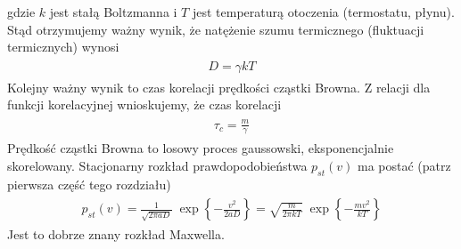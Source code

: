 \documentclass[a4paper,12pt,polish]{sphinxmanual}
\begin{document}
gdzie $k$ jest stałą Boltzmanna i $T$ jest temperaturą otoczenia (termostatu, płynu). Stąd otrzymujemy ważny wynik, że natężenie szumu termicznego (fluktuacji termicznych) wynosi
\label{ch3/chIII032:equation-eqn34}\begin{gather}
\begin{split}D= \gamma kT\end{split}\label{ch3/chIII032-eqn34}
\end{gather}
Kolejny ważny wynik to czas korelacji prędkości cząstki Browna. Z relacji dla funkcji korelacyjnej wnioskujemy, że czas korelacji
\label{ch3/chIII032:equation-eqn35}\begin{gather}
\begin{split}\tau_c = \frac{m}{\gamma}\end{split}\label{ch3/chIII032-eqn35}
\end{gather}
Prędkość cząstki Browna to losowy proces gaussowski, eksponencjalnie skorelowany. Stacjonarny rozkład prawdopodobieństwa $p_{st}(v)$ ma postać (patrz pierwsza część tego rozdziału)
\label{ch3/chIII032:equation-eqn36}\begin{gather}
\begin{split}p_{st}(v) = \frac{1}{\sqrt{2\pi aD} }\; \exp\left\{ - \frac{v^2}{2 aD}\right\} = \sqrt{\frac{m}{2\pi kT} }\; \exp\left\{ - \frac{mv^2}{kT}\right\}\end{split}\label{ch3/chIII032-eqn36}
\end{gather}
Jest to dobrze znany rozkład Maxwella.
\end{document}
